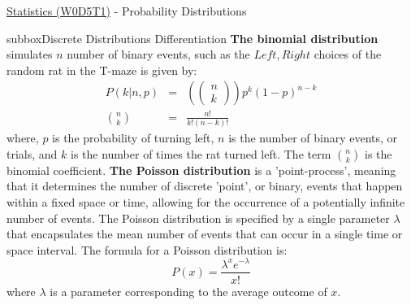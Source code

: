 \begin{textbox}{\href{https://compneuro.neuromatch.io/tutorials/W0D5_Statistics/student/W0D5_Tutorial1.html}{Statistics (W0D5T1)} - Probability Distributions}
\begin{subbox}{subbox}{Discrete Distributions Differentiation}
{\textbf{The binomial distribution} simulates $n$ number of binary events, such as the $Left, Right$ choices of the random rat in the T-maze is given by:
\begin{eqnarray*}
P(k | n,p) &= &\left( \begin{pmatrix} n \\ k\end{pmatrix} \right) p^k (1-p)^{n-k} \\
\binom{n}{k} &=& {\frac {n!}{k!(n-k)!}}
\end{eqnarray*}
where, $p$ is the probability of turning left, $n$ is the number of binary events, or trials, and $k$ is the number of times the rat turned left. The term $\binom {n}{k}$ is the binomial coefficient.
\textbf{The Poisson distribution} is a 'point-process', meaning that it determines the number of discrete 'point', or binary, events that happen within a fixed space or time, allowing for the occurrence of a potentially infinite number of events. The Poisson distribution is specified by a single parameter $\lambda$ that encapsulates the mean number of events that can occur in a single time or space interval.
The formula for a Poisson distribution is: 
\begin{equation}
P(x)=\frac{\lambda^x e^{-\lambda}}{x!}
\end{equation}
where $\lambda$ is a parameter corresponding to the average outcome of $x$.
}
\end{subbox}
\end{textbox}
